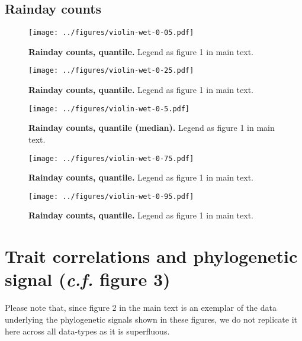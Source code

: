 \documentclass[12pt]{report}
\begin{document}
\subsection{Rainday counts}
\begin{figure}[h!]
  \begin{center}
    \texttt{[image: ../figures/violin-wet-0-05.pdf]}
  \end{center}
  \caption{\textbf{Rainday counts,  quantile.} Legend as
    figure 1 in main text.}
\end{figure}
\begin{figure}[h!]
  \begin{center}
    \texttt{[image: ../figures/violin-wet-0-25.pdf]}
  \end{center}
  \caption{\textbf{Rainday counts,  quantile.} Legend as
    figure 1 in main text.}
\end{figure}
\begin{figure}[h!]
  \begin{center}
    \texttt{[image: ../figures/violin-wet-0-5.pdf]}
  \end{center}
  \caption{\textbf{Rainday counts,  quantile (median).}
    Legend as figure 1 in main text.}
\end{figure}
\begin{figure}[h!]
  \begin{center}
    \texttt{[image: ../figures/violin-wet-0-75.pdf]}
  \end{center}
  \caption{\textbf{Rainday counts,  quantile.} Legend as
    figure 1 in main text.}
\end{figure}
\begin{figure}[h!]
  \begin{center}
    \texttt{[image: ../figures/violin-wet-0-95.pdf]}
  \end{center}
  \caption{\textbf{Rainday counts,  quantile.} Legend as
    figure 1 in main text.}
\end{figure}

\clearpage
\section{Trait correlations and phylogenetic signal (\emph{c.f.} figure 3)}

Please note that, since figure 2 in the main text is an exemplar of
the data underlying the phylogenetic signals shown in these figures,
we do not replicate it here across all data-types as it is
superfluous.
\end{document}

